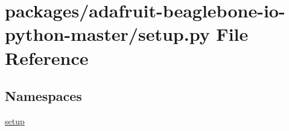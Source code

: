 \hypertarget{packages_2adafruit-beaglebone-io-python-master_2setup_8py}{}\section{packages/adafruit-\/beaglebone-\/io-\/python-\/master/setup.py File Reference}
\label{packages_2adafruit-beaglebone-io-python-master_2setup_8py}
\subsection*{Namespaces}
\begin{DoxyCompactItemize}
\item 
 \hyperlink{namespacesetup}{setup}
\end{DoxyCompactItemize}
